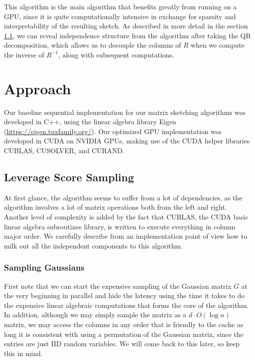 \documentclass[12pt]{article}
\begin{document}
This algorithm is the main algorithm that benefits greatly from running on a GPU, since it is quite computationally intensive in exchange for sparsity and interpretability of the resulting sketch. As described in more detail in the section \ref{approach-leverage}, we can reveal independence structure from the algorithm after taking the QR decomposition, which allows us to decouple the columns of $R$ when we compute the inverse of $R^{-1}$, along with subsequent computations. 

\section{Approach}
Our baseline sequential implementation for our matrix sketching algorithms was developed in C++, using the linear algebra library Eigen (\url{https://eigen.tuxfamily.org/}). Our optimized GPU implementation was developed in CUDA on NVIDIA GPUs, making use of the CUDA helper libraries CUBLAS, CUSOLVER, and CURAND. 

\subsection{Leverage Score Sampling}\label{approach-leverage}
At first glance, the algorithm seems to suffer from a lot of dependencies, as the algorithm involves a lot of matrix operations both from the left and right. Another level of complexity is added by the fact that CUBLAS, the CUDA basic linear algebra subroutines library, is written to execute everything in column major order. We carefully describe from an implementation point of view how to milk out all the independent components to this algorithm.

\subsubsection{Sampling Gaussians}
First note that we can start the expensive sampling of the Gaussian matrix $G$ at the very beginning in parallel and hide the latency using the time it takes to do the expensive linear algebraic computations that forms the core of the algorithm. In addition, although we may simply sample the matrix as a $d\cdot O(\log n)$ matrix, we may access the columns in any order that is friendly to the cache as long it is consistent with using a permutation of the Gaussian matrix, since the entries are just IID random variables. We will come back to this later, so keep this in mind. 
\end{document}
